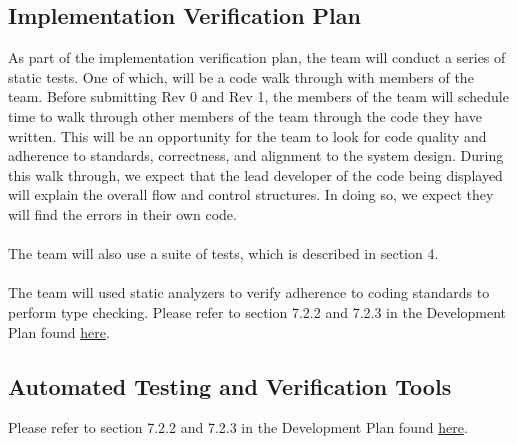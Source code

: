 \documentclass[12pt, titlepage]{article}
\begin{document}


\subsection{Implementation Verification Plan}

As part of the implementation verification plan, the team will conduct a series of static tests. One of which, will be a code walk through with members of the team.
Before submitting Rev 0 and Rev 1, the members of the team will schedule time to walk through other members of the team through the code they have written. This will be 
an opportunity for the team to look for code quality and adherence to standards, correctness, and alignment to the system design. During this walk through, we expect that 
the lead developer of the code being displayed will explain the overall flow and control structures. In doing so, we expect they will find the errors in their own code.\\\\
The team will also use a suite of tests, which is described in section 4.\\\\
The team will used static analyzers to verify adherence to coding standards to perform type checking. Please refer to section 7.2.2 and 7.2.3 in the Development Plan found \href{https://github.com/OKKM-insights/OKKM.insights/blob/main/docs/DevelopmentPlan/DevelopmentPlan.pdf}{here}.




\subsection{Automated Testing and Verification Tools}

Please refer to section 7.2.2 and 7.2.3 in the Development Plan found \href{https://github.com/OKKM-insights/OKKM.insights/blob/main/docs/DevelopmentPlan/DevelopmentPlan.pdf}{here}.
\end{document}

